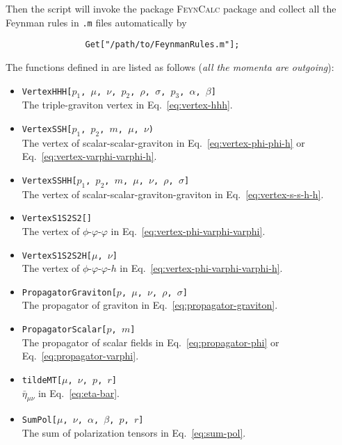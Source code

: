 \documentclass{article}
\begin{document}
            Then the script  will invoke the package \textsc{FeynCalc} package and collect all the Feynman rules in \texttt{.m} files automatically by
            \begin{verbatim}
                Get["/path/to/FeynmanRules.m"];
            \end{verbatim}
            The functions defined in  are listed as follows (\emph{all the momenta are outgoing}):
            \begin{itemize}
                \item \texttt{VertexHHH[$p_1$, $\mu$, $\nu$, $p_2$, $\rho$, $\sigma$, $p_3$, $\alpha$, $\beta$]} \\
                    The triple-graviton vertex in Eq.~\eqref{eq:vertex-hhh}.
                \item \texttt{VertexSSH[$p_1$, $p_2$, $m$, $\mu$, $\nu$)} \\
                    The vertex of scalar-scalar-graviton in Eq.~\eqref{eq:vertex-phi-phi-h} or Eq.~\eqref{eq:vertex-varphi-varphi-h}.
                \item \texttt{VertexSSHH[$p_1$, $p_2$, $m$, $\mu$, $\nu$, $\rho$, $\sigma$]} \\
                    The vertex of scalar-scalar-graviton-graviton in Eq.~\eqref{eq:vertex-s-s-h-h}.
                \item \texttt{VertexS1S2S2[]} \\
                    The vertex of $\phi$-$\varphi$-$\varphi$ in Eq.~\eqref{eq:vertex-phi-varphi-varphi}.
                \item \texttt{VertexS1S2S2H[$\mu$, $\nu$]} \\
                    The vertex of $\phi$-$\varphi$-$\varphi$-$h$ in Eq.~\eqref{eq:vertex-phi-varphi-varphi-h}.
                \item \texttt{PropagatorGraviton[$p$, $\mu$, $\nu$, $\rho$, $\sigma$]} \\
                    The propagator of graviton in Eq.~\eqref{eq:propagator-graviton}.
                \item \texttt{PropagatorScalar[$p$, $m$]} \\
                    The propagator of scalar fields in Eq.~\eqref{eq:propagator-phi} or Eq.~\eqref{eq:propagator-varphi}.
                \item \texttt{tildeMT[$\mu$, $\nu$, $p$, $r$]} \\
                    $\bar{\eta}_{\mu\nu}$ in Eq.~\eqref{eq:eta-bar}.
                \item \texttt{SumPol[$\mu$, $\nu$, $\alpha$, $\beta$, $p$, $r$]} \\
                    The sum of polarization tensors in Eq.~\eqref{eq:sum-pol}.
            \end{itemize}
        
\end{document}
